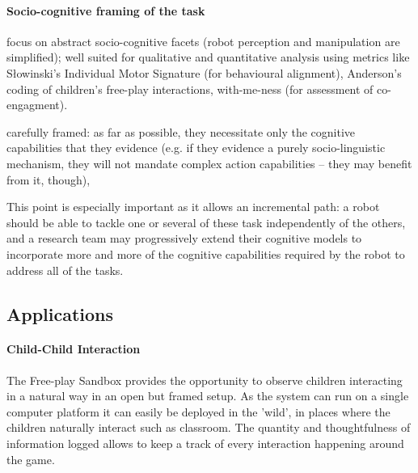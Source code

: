 \documentclass[sigconf]{acmart}
\begin{document}
%

\paragraph{Socio-cognitive framing of the task}

focus on abstract socio-cognitive facets (robot
perception and manipulation are simplified); well suited for qualitative and
quantitative analysis using metrics like Słowinski’s Individual Motor Signature
(for behavioural alignment), Anderson's~\cite{anderson2004social} coding of children’s free-play
interactions, with-me-ness (for assessment of co-engagment).

carefully framed: as far as possible, they necessitate only the cognitive
capabilities that they evidence (e.g. if they evidence a purely socio-linguistic
mechanism, they will not mandate complex action capabilities – they may benefit
from it, though),

This point is especially important as it allows an incremental path: a robot
should be able to tackle one or several of these task independently of the
others, and a research team may progressively extend their cognitive models to
incorporate more and more of the cognitive capabilities required by the robot to
address all of the tasks.

\subsection{Applications}
\label{sec:applications}

\paragraph{Child-Child Interaction}

The Free-play Sandbox provides the opportunity to observe children interacting in a natural way in an open but framed setup. As the system can run on a single computer platform it can easily be deployed in the 'wild', in places where the children naturally interact such as classroom. The quantity and thoughtfulness of information logged allows to keep a track of every interaction happening around the game. 
\end{document}
